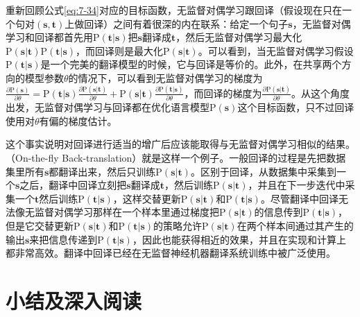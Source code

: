 \parinterval 重新回顾公式\ref{eq:7-34}对应的目标函数，无监督对偶学习跟回译（假设现在只在一个句对$(\mathbf s,\mathbf t)$上做回译）之间有着很深的内在联系：给定一个句子$\mathbf s$，无监督对偶学习和回译都首先用$\textrm{P}(\mathbf t|\mathbf s)$把$\mathbf s$翻译成$\mathbf t$，然后无监督对偶学习最大化$\textrm{P}(\mathbf s|\mathbf t)\textrm{P}(\mathbf t|\mathbf s)$，而回译则是最大化$\textrm{P}(\mathbf s|\mathbf t)$。可以看到，当无监督对偶学习假设$\textrm{P}(\mathbf t|\mathbf s)$是一个完美的翻译模型的时候，它与回译是等价的。此外，在共享两个方向的模型参数$\theta$的情况下，可以看到无监督对偶学习的梯度为$\frac{\partial \textrm{P}(\mathbf s)}{\partial \theta} =\textrm{P}(\mathbf t|\mathbf s) \frac{\partial \textrm{P}(\mathbf s|\mathbf t)}{\partial \theta}+\textrm{P}(\mathbf s|\mathbf t) \frac{\partial \textrm{P}(\mathbf t|\mathbf s)}{\partial \theta} $，而回译的梯度为$\frac{\partial \textrm{P}(\mathbf s|\mathbf t)}{\partial \theta}$。从这个角度出发，无监督对偶学习与回译都在优化语言模型$\textrm{P}(\mathbf s)$这个目标函数，只不过回译使用对$\theta$有偏的梯度估计。

\parinterval 这个事实说明对回译进行适当的增广后应该能取得与无监督对偶学习相似的结果。{\small{}}（On-the-fly Back-translation）就是这样一个例子。一般回译的过程是先把数据集里所有$\mathbf s$都翻译出来，然后只训练$\textrm{P}(\mathbf s|\mathbf t)$。区别于回译，从数据集中采集到一个$\mathbf s$之后，翻译中回译立刻把$\mathbf s$翻译成$\mathbf t$，然后训练$\textrm{P}(\mathbf s|\mathbf t)$，并且在下一步迭代中采集一个$\mathbf t$然后训练$\textrm{P}(\mathbf t|\mathbf s)$，这样交替更新$\textrm{P}(\mathbf s|\mathbf t)$和$\textrm{P}(\mathbf t|\mathbf s)$。尽管翻译中回译无法像无监督对偶学习那样在一个样本里通过梯度把$\textrm{P}(\mathbf s|\mathbf t)$的信息传到$\textrm{P}(\mathbf t|\mathbf s)$，但是它交替更新$\textrm{P}(\mathbf s|\mathbf t)$和$\textrm{P}(\mathbf t|\mathbf s)$的策略允许$\textrm{P}(\mathbf s|\mathbf t)$在两个样本间通过其产生的输出$\mathbf s$来把信息传递到$\textrm{P}(\mathbf t|\mathbf s)$，因此也能获得相近的效果，并且在实现和计算上都非常高效。翻译中回译已经在无监督神经机器翻译系统训练中被广泛使用\cite{lample2019cross}。


\sectionnewpage
\section{小结及深入阅读}

